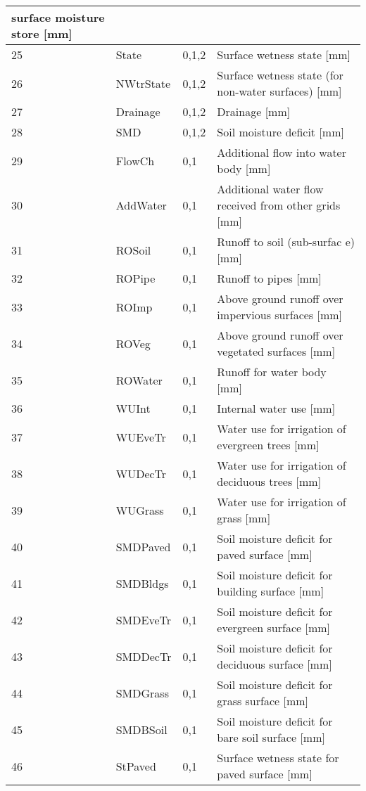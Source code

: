 \documentclass[letterpaper,10pt,english]{sphinxmanual}
\begin{document}
\begin{savenotes}
\begin{longtable}{|l|l|l|l|}
surface
moisture
store {[}mm{]}
\\
\hline
25
&
State
&
0,1,2
&
Surface
wetness
state {[}mm{]}
\\
\hline
26
&
NWtrState
&
0,1,2
&
Surface
wetness
state (for
non-water
surfaces)
{[}mm{]}
\\
\hline
27
&
Drainage
&
0,1,2
&
Drainage
{[}mm{]}
\\
\hline
28
&
SMD
&
0,1,2
&
Soil
moisture
deficit
{[}mm{]}
\\
\hline
29
&
FlowCh
&
0,1
&
Additional
flow into
water body
{[}mm{]}
\\
\hline
30
&
AddWater
&
0,1
&
Additional
water flow
received
from other
grids {[}mm{]}
\\
\hline
31
&
ROSoil
&
0,1
&
Runoff to
soil
(sub-surfac
e)
{[}mm{]}
\\
\hline
32
&
ROPipe
&
0,1
&
Runoff to
pipes {[}mm{]}
\\
\hline
33
&
ROImp
&
0,1
&
Above
ground
runoff over
impervious
surfaces
{[}mm{]}
\\
\hline
34
&
ROVeg
&
0,1
&
Above
ground
runoff over
vegetated
surfaces
{[}mm{]}
\\
\hline
35
&
ROWater
&
0,1
&
Runoff for
water body
{[}mm{]}
\\
\hline
36
&
WUInt
&
0,1
&
Internal
water use
{[}mm{]}
\\
\hline
37
&
WUEveTr
&
0,1
&
Water use
for
irrigation
of
evergreen
trees {[}mm{]}
\\
\hline
38
&
WUDecTr
&
0,1
&
Water use
for
irrigation
of
deciduous
trees {[}mm{]}
\\
\hline
39
&
WUGrass
&
0,1
&
Water use
for
irrigation
of grass
{[}mm{]}
\\
\hline
40
&
SMDPaved
&
0,1
&
Soil
moisture
deficit for
paved
surface
{[}mm{]}
\\
\hline
41
&
SMDBldgs
&
0,1
&
Soil
moisture
deficit for
building
surface
{[}mm{]}
\\
\hline
42
&
SMDEveTr
&
0,1
&
Soil
moisture
deficit for
evergreen
surface
{[}mm{]}
\\
\hline
43
&
SMDDecTr
&
0,1
&
Soil
moisture
deficit for
deciduous
surface
{[}mm{]}
\\
\hline
44
&
SMDGrass
&
0,1
&
Soil
moisture
deficit for
grass
surface
{[}mm{]}
\\
\hline
45
&
SMDBSoil
&
0,1
&
Soil
moisture
deficit for
bare soil
surface
{[}mm{]}
\\
\hline
46
&
StPaved
&
0,1
&
Surface
wetness
state for
paved
surface
{[}mm{]}
\\

\end{longtable}
\end{savenotes}
\end{document}
